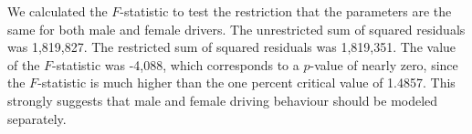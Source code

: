 



We calculated the $F$-statistic to test the restriction 
that the parameters are the same for both male and female drivers. 
The unrestricted sum of squared residuals was 1,819,827. 
The restricted sum of squared residuals was 1,819,351. 
The value of the $F$-statistic was -4,088, 
which corresponds to a $p$-value of nearly zero, since the $F$-statistic is much higher than 
 the one percent critical value of 1.4857. 
This strongly suggests that male and female driving behaviour should be modeled separately. 
